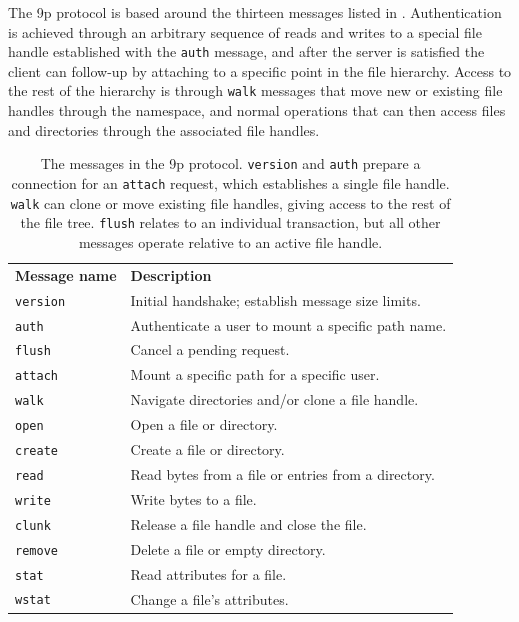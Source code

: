The 9p protocol is based around the thirteen messages listed in . Authentication is achieved through an arbitrary sequence of reads and writes to a special file handle established with the \texttt{auth} message, and after the server is satisfied the client can follow-up by attaching to a specific point in the file hierarchy. Access to the rest of the hierarchy is through \texttt{walk} messages that move new or existing file handles through the namespace, and normal operations that can then access files and directories through the associated file handles.

\begin{table}[tp]
\begin{center}
\begin{tabular}{lp{8cm}}
\textbf{Message name} & \textbf{Description} \\
\texttt{version} & Initial handshake; establish message size limits. \\
\texttt{auth} & Authenticate a user to mount a specific path name. \\
\texttt{flush} & Cancel a pending request. \\
\texttt{attach} & Mount a specific path for a specific user. \\
\texttt{walk} & Navigate directories and/or clone a file handle. \\
\texttt{open} & Open a file or directory. \\
\texttt{create} & Create a file or directory. \\
\texttt{read} & Read bytes from a file or entries from a directory. \\
\texttt{write} & Write bytes to a file. \\
\texttt{clunk} & Release a file handle and close the file. \\
\texttt{remove} & Delete a file or empty directory. \\
\texttt{stat} & Read attributes for a file. \\
\texttt{wstat} & Change a file's attributes.
\end{tabular}
\end{center}
\caption[Messages in the 9p protocol]{The messages in the 9p protocol. \texttt{version} and \texttt{auth} prepare a connection for an \texttt{attach} request, which establishes a single file handle. \texttt{walk} can clone or move existing file handles, giving access to the rest of the file tree. \texttt{flush} relates to an individual transaction, but all other messages operate relative to an active file handle.}
\label{tab:9p-messages}
\end{table}

